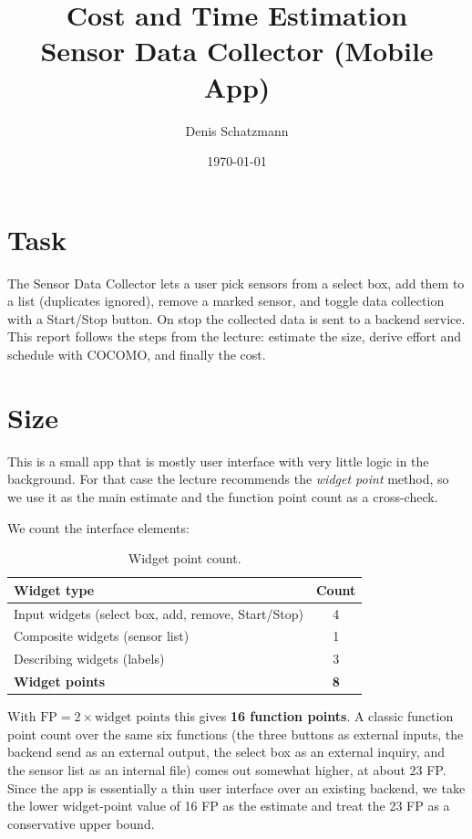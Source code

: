 \documentclass[11pt]{article}
\title{Cost and Time Estimation\\\large Sensor Data Collector (Mobile App)}
\author{Denis Schatzmann}
\date{\today}
\begin{document}
\maketitle

\section{Task}
The Sensor Data Collector lets a user pick sensors from a select box, add them
to a list (duplicates ignored), remove a marked sensor, and toggle data
collection with a Start/Stop button. On stop the collected data is sent to a
backend service. This report follows the steps from the lecture: estimate the
size, derive effort and schedule with COCOMO, and finally the cost.

\section{Size}
This is a small app that is mostly user interface with very little logic in the
background. For that case the lecture recommends the \emph{widget point} method,
so we use it as the main estimate and the function point count as a cross-check.

We count the interface elements:

\begin{table}[h]
\centering
\begin{tabular}{l c}
\toprule
\textbf{Widget type} & \textbf{Count} \\
\midrule
Input widgets (select box, add, remove, Start/Stop)  & 4 \\
Composite widgets (sensor list)                      & 1 \\
Describing widgets (labels)                          & 3 \\
\midrule
\textbf{Widget points} & \textbf{8} \\
\bottomrule
\end{tabular}
\caption{Widget point count.}
\end{table}

\noindent
With $\text{FP} = 2 \times \text{widget points}$ this gives \textbf{16 function
points}. A classic function point count over the same six functions (the three
buttons as external inputs, the backend send as an external output, the select
box as an external inquiry, and the sensor list as an internal file) comes out
somewhat higher, at about 23 FP. Since the app is essentially a thin user
interface over an existing backend, we take the lower widget-point value of
16 FP as the estimate and treat the 23 FP as a conservative upper bound.
\end{document}
